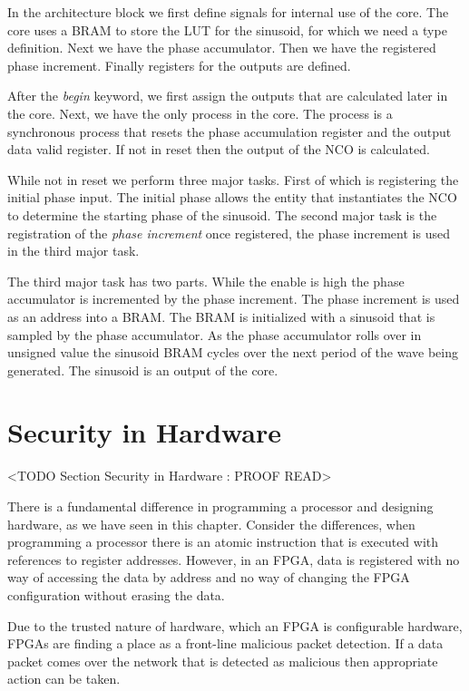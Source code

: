 In the architecture block we first define signals for internal use of the core. The core uses a \ac{BRAM} to store the \ac{LUT} for the sinusoid, for which we need a type definition. Next we have the phase accumulator. Then we have the registered phase increment. Finally registers for the outputs are defined.

After the \emph{begin} keyword, we first assign the outputs that are calculated later in the core. Next, we have the only process in the core. The process is a synchronous process that resets the phase accumulation register and the output data valid register. If not in reset then the output of the \ac{NCO} is calculated. 

While not in reset we perform three major tasks. First of which is registering the initial phase input. The initial phase allows the entity that instantiates the \ac{NCO} to determine the starting phase of the sinusoid. The second major task is the registration of the \emph{phase increment} once registered, the phase increment is used in the third major task.

The third major task has two parts. While the enable is high the phase accumulator is incremented by the phase increment. The phase increment is used as an address into a \ac{BRAM}. The \ac{BRAM} is initialized with a sinusoid that is sampled by the phase accumulator. As the phase accumulator rolls over in unsigned value the sinusoid \ac{BRAM} cycles over the next period of the wave being generated. The sinusoid is an output of the core. 

\section{Security in Hardware}
	<TODO Section Security in Hardware : PROOF READ>

There is a fundamental difference in programming a processor and designing hardware, as we have seen in this chapter. Consider the differences, when programming a processor there is an atomic instruction that is executed with references to register addresses. However, in an \ac{FPGA}, data is registered with no way of accessing the data by address and no way of changing the \ac{FPGA} configuration without erasing the data. 

Due to the trusted nature of hardware, which an \ac{FPGA} is configurable hardware, \ac{FPGA}s are finding a place as a front-line malicious packet detection. If a data packet comes over the network that is detected as malicious then appropriate action can be taken. 
